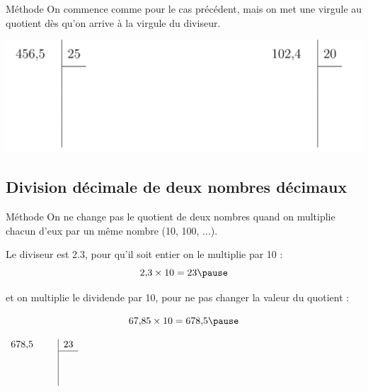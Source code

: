 \documentclass[xcolor={dvipsnames}]{beamer}
\begin{document}
\begin{frame}
	\begin{block}{Méthode}
		On commence comme pour le cas précédent, mais on met une virgule au quotient dès qu'on arrive à la virgule du diviseur.\pause
	\end{block}



\begin{myexs}
	\begin{center}
		\includegraphics[scale=0.45]{div3}
	\end{center}
\end{myexs}

\end{frame}

\subsection{Division décimale de deux nombres décimaux}

\begin{frame}
	\begin{block}{Méthode}
			On ne change pas le quotient de deux nombres  quand on multiplie chacun d'eux par un même nombre (10, 100, ...). \pause
	\end{block}
	
	
	
	\begin{myexs}
		
		Le diviseur est \num{2.3}, pour qu'il soit entier on le multiplie par 10 : \pause		
		\begin{equation*}
			\num{2.3} \times 10 = 23 \pause
		\end{equation*}
		
		\vspace*{-0.2cm}
		et on multiplie le dividende par 10, pour ne pas changer la valeur du quotient :	\pause	
		
		
		\begin{equation*}
			\num{67.85} \times 10 = \num{678.5} \pause
		\end{equation*}
		
		\vspace*{-0.2cm}
		\begin{center}
			$\begin{array}{rc|c}
				\num{678.5} \quad & & 23 \\
				\cline{3-3}
				&  \\
				& & \\
				& & \\
			\end{array}$
		\end{center}
		
		
		

	\end{myexs}
\end{frame}
\end{document}
